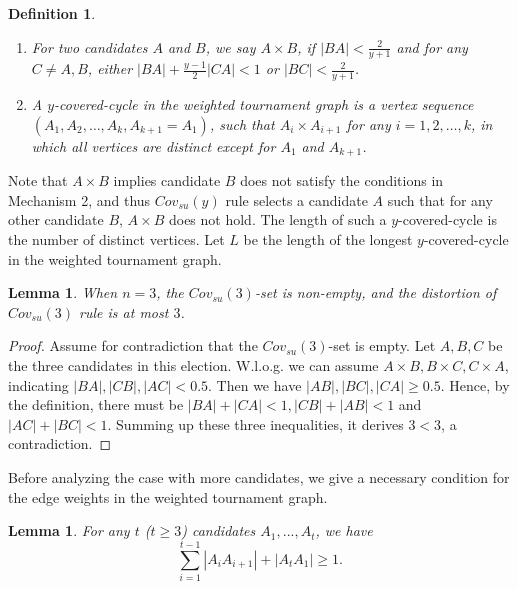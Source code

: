 \documentclass[11pt]{article}
\newtheorem{lemma}[theorem]{Lemma}
\newtheorem{definition}[theorem]{Definition}
\theoremstyle{remark}
\begin{document}
 \begin{definition}
 \begin{enumerate}
 \item For two candidates $A$ and $B$, we say $A\times B$, if $|BA|<\frac{2}{y+1}$ and for any $C\neq A,B$, either $|BA|+\frac{y-1}{2}|CA|<1$ or $|BC|<\frac{2}{y+1}$.
\item A \emph{$y$-covered-cycle} in the weighted tournament graph is a vertex  sequence $(A_1,A_2,\ldots,A_k,A_{k+1}=A_1)$, such that $A_i\times A_{i+1}$ for any $i=1,2,\ldots,k$, in which all vertices are distinct except for $A_1$ and $A_{k+1}$.
    \end{enumerate}
    \end{definition}
     Note that $A\times B$ implies candidate $B$ does not satisfy the conditions in Mechanism 2, and thus $Cov_{su}(y)$ rule selects a candidate $A$ such that for any other candidate $B$, $A\times B$ does not hold. The length of such a $y$-covered-cycle is the number of distinct vertices.  Let $L$ be the length of the longest $y$-covered-cycle in the weighted tournament graph.

 \begin{lemma}\label{lem:n3}
 When $n=3$, the $Cov_{su}(3)$-set is non-empty, and the distortion of $Cov_{su}(3)$ rule is at most $3$.
 \end{lemma}

 \begin{proof}
 Assume for contradiction that the $Cov_{su}(3)$-set is empty. Let $A,B,C$ be the three candidates in this election. W.l.o.g. we can assume $A\times B,B\times C,C\times A$, indicating $|BA|,|CB|,|AC|<0.5$. Then we have $|AB|,|BC|,|CA|\ge 0.5$. Hence, by the definition, there must be $|BA|+|CA|<1,|CB|+|AB|<1$ and $|AC|+|BC|<1$. Summing up these three inequalities, it derives $3<3$, a contradiction.
 \end{proof}

 Before analyzing the case with more candidates, we give a necessary condition for the edge weights in the weighted tournament graph.

 \begin{lemma}\label{lem:loop}
 For any $t$ ($t\ge 3$) candidates $A_1,...,A_t$, we have
$$ \sum_{i = 1}^{t-1}{|A_iA_{i+1}|}+|A_tA_1| \ge 1. $$
\end{lemma}
\end{document}
